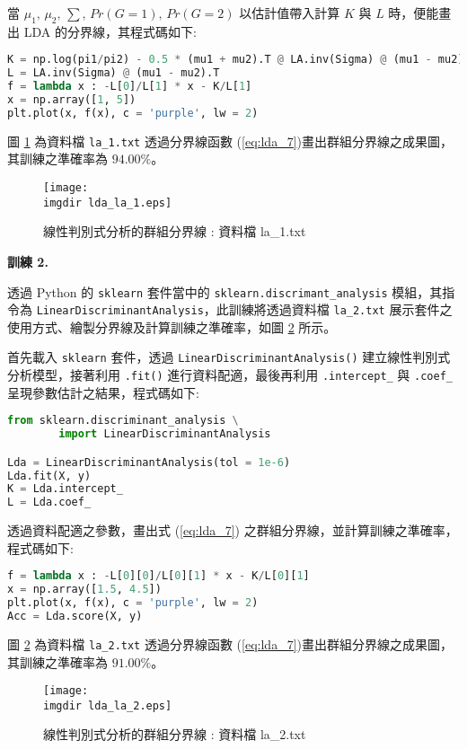 當 $\mu_1,\, \mu_2,\, \sum,\, Pr(G = 1),\, Pr(G = 2)$ 以估計值帶入計算 $K$ 與 $L$ 時，便能畫出 LDA 的分界線，其程式碼如下:
\bigskip
\begin{lstlisting}[language = Python]
K = np.log(pi1/pi2) - 0.5 * (mu1 + mu2).T @ LA.inv(Sigma) @ (mu1 - mu2)
L = LA.inv(Sigma) @ (mu1 - mu2).T
f = lambda x : -L[0]/L[1] * x - K/L[1]
x = np.array([1, 5])
plt.plot(x, f(x), c = 'purple', lw = 2)
\end{lstlisting}

圖 \ref{fig:lda_la_1} 為資料檔 \verb|la_1.txt| 透過分界線函數 (\ref{eq:lda_7})畫出群組分界線之成果圖，其訓練之準確率為 $94.00\%$。
\begin{figure}[H]
    \centering
        \texttt{[image: \\imgdir lda\_la\_1.eps]}
    \caption{線性判別式分析的群組分界線 : 資料檔 la\_1.txt}
    \label{fig:lda_la_1}
\end{figure}

\textbf{\large 訓練 2.}

透過 Python 的 \verb|sklearn| 套件當中的 \verb|sklearn.discrimant_analysis| 模組，其指令為 \verb|LinearDiscriminantAnalysis|，此訓練將透過資料檔 \verb|la_2.txt| 展示套件之使用方式、繪製分界線及計算訓練之準確率，如圖 \ref{fig:lda_la_2} 所示。

首先載入 \verb|sklearn| 套件，透過 \verb|LinearDiscriminantAnalysis()| 建立線性判別式分析模型，接著利用 \verb|.fit()| 進行資料配適，最後再利用 \verb|.intercept_| 與 \verb|.coef_| 呈現參數估計之結果，程式碼如下:
\bigskip
\begin{lstlisting}[language = Python]
from sklearn.discriminant_analysis \
		import LinearDiscriminantAnalysis

Lda = LinearDiscriminantAnalysis(tol = 1e-6)
Lda.fit(X, y)
K = Lda.intercept_
L = Lda.coef_
\end{lstlisting}

透過資料配適之參數，畫出式 (\ref{eq:lda_7}) 之群組分界線，並計算訓練之準確率，程式碼如下:

\begin{lstlisting}[language = Python]
f = lambda x : -L[0][0]/L[0][1] * x - K/L[0][1]
x = np.array([1.5, 4.5])
plt.plot(x, f(x), c = 'purple', lw = 2)
Acc = Lda.score(X, y)
\end{lstlisting}

圖 \ref{fig:lda_la_2} 為資料檔 \verb|la_2.txt| 透過分界線函數 (\ref{eq:lda_7})畫出群組分界線之成果圖，其訓練之準確率為 $91.00\%$。
\begin{figure}[H]
    \centering
        \texttt{[image: \\imgdir lda\_la\_2.eps]}
    \caption{線性判別式分析的群組分界線 : 資料檔 la\_2.txt}
    \label{fig:lda_la_2}
\end{figure}


